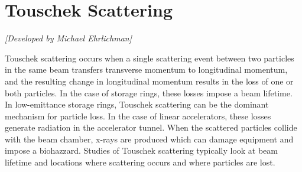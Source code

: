 \section{Touschek Scattering}
\label{s:touschek}

\textit{[Developed by Michael Ehrlichman]}

Touschek scattering occurs when a single
scattering event between two particles in the same beam transfers
transverse momentum to longitudinal momentum, and the resulting change
in longitudinal momentum results in the loss of one or both particles.
In the case of storage rings, these losses impose a beam lifetime.  In
low-emittance storage rings, Touschek scattering can be the dominant
mechanism for particle loss.  In the case of linear accelerators,
these losses generate radiation in the accelerator tunnel.  When the
scattered particles collide with the beam chamber, x-rays are produced
which can damage equipment and impose a biohazzard.  Studies of
Touschek scattering typically look at beam lifetime and locations
where scattering occurs and where particles are lost.

